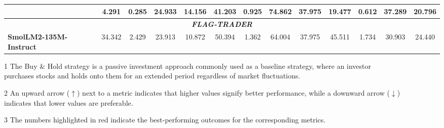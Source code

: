 \begin{table*}[thbp]
\begin{threeparttable}
{\begin{tabular}{@{}lcccc|cccc|cccc@{}}
& 4.291 & 0.285 & 24.933 &14.156 
& 41.203 & 0.925 & 74.862 & 37.975

& 19.477 & 0.612 & 37.289 & 20.796\\
\midrule
\multicolumn{13}{c}{\textit{\textbf{FLAG-TRADER }}} \\
\textbf{SmolLM2-135M-Instruct}  
 
& 34.342 & 2.429 & 23.913 & 10.872
& 50.394 & 1.362 & 64.004 & 37.975

& 45.511 & 1.734 & 30.903 & 24.440\\
\bottomrule
\end{tabular}
}
\begin{tablenotes}
    \footnotesize
    \item[1] \small{The Buy \& Hold strategy is a passive investment approach commonly used as a baseline strategy, where an investor \\ purchases stocks and holds onto them for an extended period regardless of market fluctuations.}
    \item[2] \small{An upward arrow (\(\uparrow\)) next to a metric indicates that higher values signify better performance, while a downward arrow (\(\downarrow\))} \\
indicates that lower values are preferable.
    \item[3] \small{The numbers highlighted in red indicate the best-performing outcomes for the corresponding metrics.}
\end{tablenotes}
\end{threeparttable}
\vspace{-0.0cm}
\end{table*}
